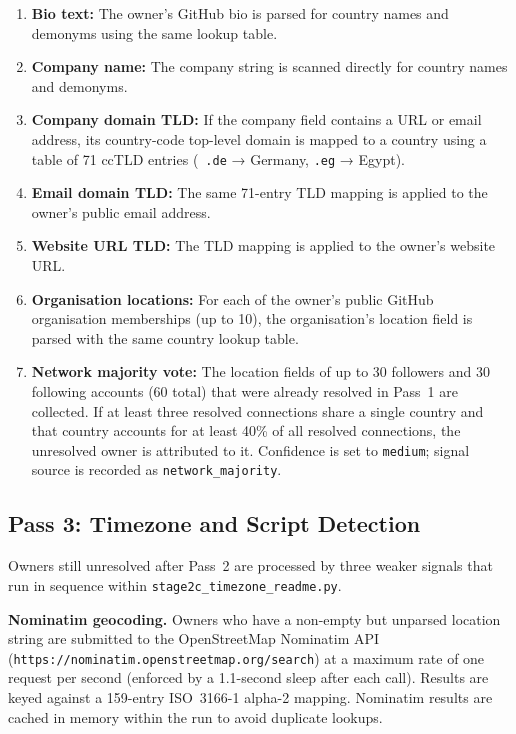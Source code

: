 \begin{enumerate}
  \item \textbf{Bio text:} The owner's GitHub bio is parsed for country names and demonyms using the same lookup table.
  \item \textbf{Company name:} The company string is scanned directly for country names and demonyms.
  \item \textbf{Company domain TLD:} If the company field contains a URL or email address, its country-code top-level domain is mapped to a country using a table of 71 ccTLD entries (\eg\ \texttt{.de} → Germany, \texttt{.eg} → Egypt).
  \item \textbf{Email domain TLD:} The same 71-entry TLD mapping is applied to the owner's public email address.
  \item \textbf{Website URL TLD:} The TLD mapping is applied to the owner's website URL.
  \item \textbf{Organisation locations:} For each of the owner's public GitHub organisation memberships (up to 10), the organisation's location field is parsed with the same country lookup table.
  \item \textbf{Network majority vote:} The location fields of up to 30 followers and 30 following accounts (60 total) that were already resolved in Pass~1 are collected. If at least three resolved connections share a single country and that country accounts for at least 40\% of all resolved connections, the unresolved owner is attributed to it. Confidence is set to \texttt{medium}; signal source is recorded as \texttt{network\_majority}.
\end{enumerate}

\subsection{Pass 3: Timezone and Script Detection}

Owners still unresolved after Pass~2 are processed by three weaker signals that run in sequence within \texttt{stage2c\_timezone\_readme.py}.

\textbf{Nominatim geocoding.} Owners who have a non-empty but unparsed location string are submitted to the OpenStreetMap Nominatim API (\texttt{https://nominatim.openstreetmap.org/search}) at a maximum rate of one request per second (enforced by a 1.1-second sleep after each call). Results are keyed against a 159-entry ISO~3166-1 alpha-2 mapping. Nominatim results are cached in memory within the run to avoid duplicate lookups.

